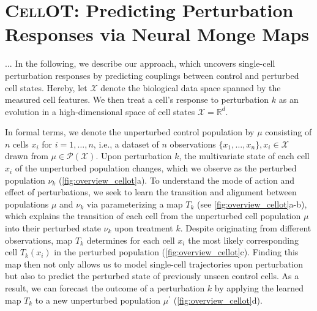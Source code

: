 \section{\textsc{CellOT}: Predicting Perturbation Responses via Neural Monge Maps}

...
In the following, we describe our approach, which uncovers single-cell perturbation responses by predicting couplings between control and perturbed cell states.
Hereby, let $\mathcal{X}$ denote the biological data space spanned by the measured cell features. We then treat a cell's response to perturbation $k$ as an evolution in a high-dimensional space of cell states $\mathcal{X} = \mathbb{R}^d$.

In formal terms, we denote the unperturbed control population by $\mu$ consisting of $n$ cells $x_i$ for $i = 1, \dots, n$, i.e., a dataset of $n$ observations $\{ x_1, \dots, x_n \}, x_i \in \mathcal{X}$ drawn from $\mu \in \mathcal{P}(\mathcal{X})$. Upon perturbation $k$, the multivariate state of each cell $x_i$ of the unperturbed population changes, which we observe as the perturbed population $\nu_k$ (\cref{fig:overview_cellot}a).
To understand the mode of action and effect of perturbations, we seek to learn the transition and alignment between populations $\mu$ and $\nu_k$ via parameterizing a map $T_k$ (see \cref{fig:overview_cellot}a-b), which explains the transition of each cell from the unperturbed cell population $\mu$ into their perturbed state $\nu_k$ upon treatment $k$.
Despite originating from  different observations, map $T_k$ determines for each cell $x_i$ the most likely corresponding cell $T_k(x_i)$ in the perturbed population (\cref{fig:overview_cellot}c).
Finding this map then not only allows us to model single-cell trajectories upon perturbation but also to predict the perturbed state of previously unseen control cells. As a result, we can forecast the outcome of a perturbation $k$  by applying the learned map $T_k$ to a new unperturbed population $\mu^\prime$ (\cref{fig:overview_cellot}d).


